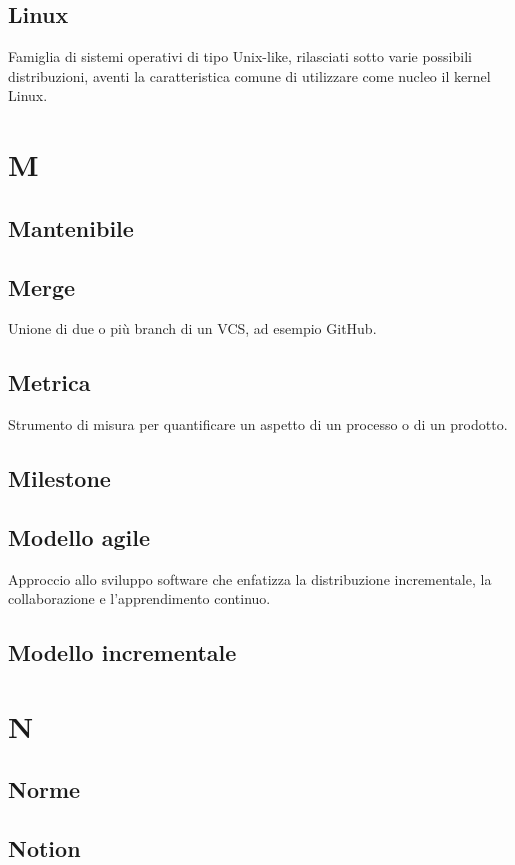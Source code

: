 \documentclass[12pt]{article}
\begin{document}
		\subsection{Linux}
		Famiglia di sistemi operativi di tipo Unix-like, rilasciati sotto varie possibili distribuzioni, aventi la caratteristica comune di utilizzare come nucleo il kernel Linux.

	\clearpage
	\section{M}
		\subsection{Mantenibile}
		\subsection{Merge}
		Unione di due o più branch di un VCS, ad esempio GitHub.
		\subsection{Metrica}
		Strumento di misura per quantificare un aspetto di un processo o di un prodotto.
		\subsection{Milestone}
		\subsection{Modello agile}
		Approccio allo sviluppo software che enfatizza la distribuzione incrementale, la collaborazione e l'apprendimento continuo.

		\subsection{Modello incrementale}

	\clearpage
	\section{N}
		\subsection{Norme}
		\subsection{Notion}
	\clearpage
\end{document}
